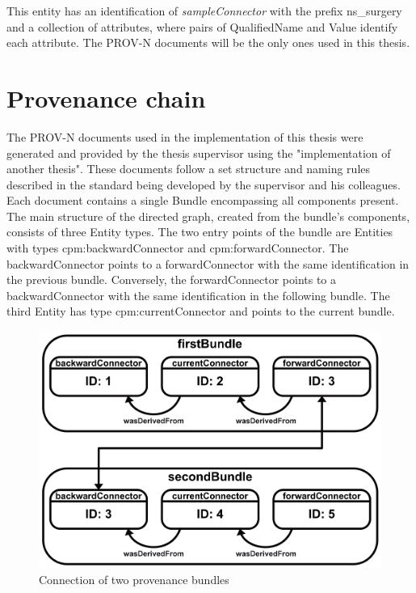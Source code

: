 \documentclass[
  digital,     %
  oneside,     %
  nosansbold,  %
  nocolorbold, %
  lof,         %
  lot,         %
]{fithesis4}
\begin{document}
This entity has an identification of \textit{sampleConnector} with the prefix ns\_surgery and a collection of attributes, where pairs of QualifiedName and Value identify each attribute. The PROV-N documents will be the only ones used in this thesis.
\shorthandon{-}

\section{Provenance chain}
\shorthandoff{-}
The PROV-N documents used in the implementation of this thesis were generated and provided by the thesis supervisor using the "implementation of another thesis". These documents follow a set structure and naming rules described in the standard being developed by the supervisor and his colleagues. Each document contains a single Bundle encompassing all components present. The main structure of the directed graph, created from the bundle's components, consists of three Entity types. The two entry points of the bundle are Entities with types cpm:backwardConnector and cpm:forwardConnector. The backwardConnector points to a forwardConnector with the same identification in the previous bundle. Conversely, the forwardConnector points to a backwardConnector with the same identification in the following bundle. The third Entity has type cpm:currentConnector and points to the current bundle. 

\begin{figure}[htbp]
  \begin{center}
    \includegraphics[width=12.5cm]{fithesis/images/bundleconnection.png}
  \end{center}
  \caption{Connection of two provenance bundles}
  \label{fig:bundleconnection}
\end{figure}
\end{document}
